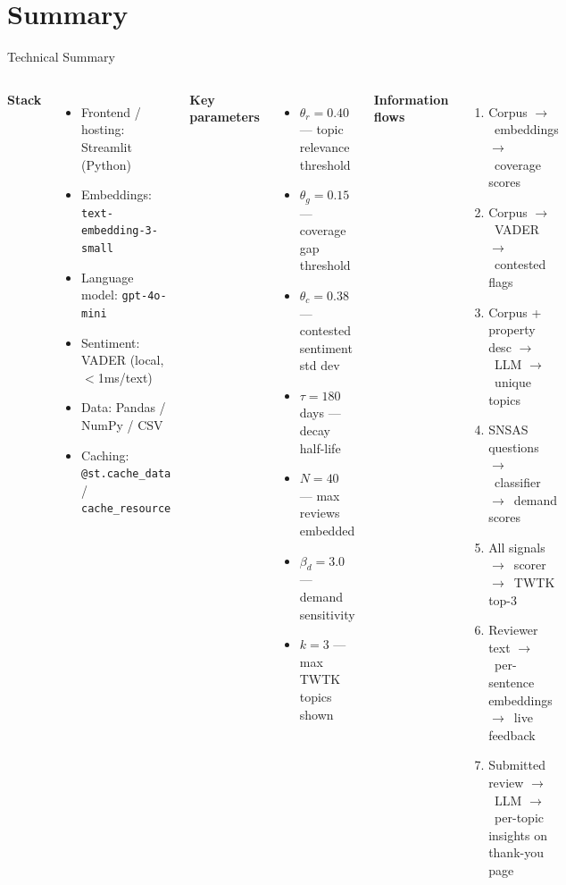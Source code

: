 \documentclass[aspectratio=169,10pt]{beamer}
\newcommand{\arrow}{$\rightarrow$}
\begin{document}
\section{Summary}

\begin{frame}{Technical Summary}
\begin{columns}[T]
\textbf{Stack}
\begin{itemize}
  \item Frontend / hosting: Streamlit (Python)
  \item Embeddings: \texttt{text-embedding-3-small}
  \item Language model: \texttt{gpt-4o-mini}
  \item Sentiment: VADER (local, $<$1ms/text)
  \item Data: Pandas / NumPy / CSV
  \item Caching: \texttt{@st.cache\_data} / \texttt{cache\_resource}
\end{itemize}

\medskip
\textbf{Key parameters}
\begin{itemize}
  \item $\theta_r = 0.40$ — topic relevance threshold
  \item $\theta_g = 0.15$ — coverage gap threshold
  \item $\theta_c = 0.38$ — contested sentiment std dev
  \item $\tau = 180$ days — decay half-life
  \item $N = 40$ — max reviews embedded
  \item $\beta_d = 3.0$ — demand sensitivity
  \item $k = 3$ — max TWTK topics shown
\end{itemize}

\textbf{Information flows}
\begin{enumerate}
  \item Corpus \arrow\ embeddings \arrow\ coverage scores
  \item Corpus \arrow\ VADER \arrow\ contested flags
  \item Corpus + property desc \arrow\ LLM \arrow\ unique topics
  \item SNSAS questions \arrow\ classifier \arrow\ demand scores
  \item All signals \arrow\ scorer \arrow\ TWTK top-3
  \item Reviewer text \arrow\ per-sentence embeddings \arrow\ live feedback
  \item Submitted review \arrow\ LLM \arrow\ per-topic insights on thank-you page
\end{enumerate}
\end{columns}
\end{frame}
\end{document}

